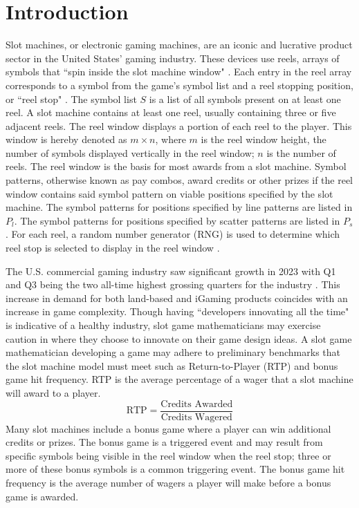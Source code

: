 \documentclass[conference]{IEEEtran}
\begin{document}
\section{Introduction}
Slot machines, or electronic gaming machines, are an iconic and lucrative product sector in the United States' gaming industry.
These devices use reels, arrays of symbols that ``spin inside the slot machine window" \cite{SlotsDict}.
Each entry in the reel array corresponds to a symbol from the game's symbol list and a reel stopping position, or ``reel stop" \cite{SlotsDict}.
The symbol list $S$ is a list of all symbols present on at least one reel.
A slot machine contains at least one reel, usually containing three or five adjacent reels.
The reel window displays a portion of each reel to the player.
This window is hereby denoted as $m\times n$, where $m$ is the reel window height, the number of symbols displayed vertically in the reel window; $n$ is the number of reels. 
The reel window is the basis for most awards from a slot machine.
Symbol patterns, otherwise known as pay combos, award credits or other prizes if the reel window contains said symbol pattern on viable positions specified by the slot machine.
The symbol patterns for positions specified by line patterns are listed in $P_l$.
The symbol patterns for positions specified by scatter patterns are listed in $P_s$.
For each reel, a random number generator (RNG) is used to determine which reel stop is selected to display in the reel window \cite{SlotsDict}.
\par
The U.S. commercial gaming industry saw significant growth in 2023 with Q1 and Q3 being the two all-time highest grossing quarters for the industry \cite{AGA2023}.
This increase in demand for both land-based and iGaming products coincides with an increase in game complexity.
Though having ``developers innovating all the time" \cite{Baldo2022} is indicative of a healthy industry, slot game mathematicians may exercise caution in where they choose to innovate on their game design ideas.
A slot game mathematician developing a game may adhere to preliminary benchmarks that the slot machine model must meet such as Return-to-Player (RTP) and bonus game hit frequency. RTP is the average percentage of a wager that a slot machine will award to a player.
\begin{equation}
\text{RTP} = \frac{\text{Credits Awarded}}{\text{Credits Wagered}}
\end{equation}
Many slot machines include a bonus game where a player can win additional credits or prizes. The bonus game is a triggered event and may result from specific symbols being visible in the reel window when the reel stop; three or more of these bonus symbols is a common triggering event. The bonus game hit frequency is the average number of wagers a player will make before a bonus game is awarded.
\end{document}
